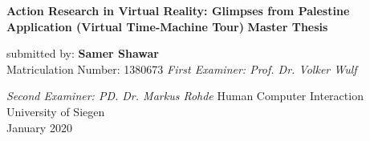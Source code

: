 \begin{titlepage}
    \begin{center}
        \vspace*{1cm}
        \Huge
        \textbf{Action Research in Virtual Reality: Glimpses from Palestine Application (Virtual Time-Machine Tour)}
        \vfill
        \LARGE
        \textbf{Master Thesis}
        
        \vspace{0.5cm}
        submitted by:
        \vspace{1.5cm}
        \textbf{Samer Shawar}\\
        Matriculation Number: 1380673
        \vfill
        \textit {First Examiner: Prof. Dr. Volker Wulf}
        
        
        \textit {Second Examiner: PD. Dr. Markus Rohde}
        \vfill
        \Large
        Human Computer Interaction\\
        University of Siegen\\
        January 2020\\
 \end{center}
\end{titlepage}